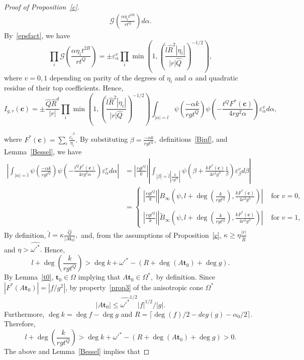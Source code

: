 \documentclass[10pt]{amsart}
\theoremstyle{plain}
\theoremstyle{plain}
\renewcommand{\vec}[1]{\mathbf{#1}}
\theoremstyle{remark}
\theoremstyle{definition}
\renewcommand{\hat}{\widehat}
\newcommand{\hQ}{\widehat{Q}}
\newcommand{\hR}{\widehat{R}}
\newcommand{\hl}{\widehat l}
\newcommand{\cG}{\mathcal{G}}
\begin{document}
\begin{proof}[Proof of Proposition~\ref{c}]
\begin{equation*}
\begin{split}
\cG\left(\frac{\alpha \eta_i t^{2R}}{rt^Q}\right)
d\alpha.
\end{split}
\end{equation*}
By~\eqref{epsfact},  we have 
\[
 \prod_{i}\cG\left(\frac{\alpha \eta_i t^{2R}}{rt^Q}\right) 
  =\pm\varepsilon_{\alpha}^{v} \prod_{i}\min\left(1,\left(\frac{\hl \hR^2|\eta_i|}{|r|\hQ}\right)^{-1/2}\right), 
\]
where $v=0 ,1$ depending on parity of the degrees of $\eta_i$ and $\alpha$ and quadratic residue of their top coefficients.   Hence,
\[
I_{g,r}(\vec{c})=\pm\frac{\hQ\hR^{d}}{|r|} \prod_{i}\min\left(1,\left(\frac{\hl \hR^2|\eta_i|}{|r|\hQ}\right)^{-1/2}\right) \int _{ |\alpha| =\hat{l}  }  \psi(\frac{-\alpha k}{rgt^Q})   \psi (-\frac{t^QF^*(\vec{c})}{4rg^2 \alpha}) \varepsilon_{\alpha}^v d\alpha,
\]

where $F^*(\vec{c})=\sum_{i} \frac{{c_i^{\prime}}^2}{\eta_i}.$  By substituting $\beta=\frac{-\alpha k}{rgt^Q},$ definitions~\eqref{Binf}, and
  Lemma~\ref{Bessel}, we have 
\begin{equation*}
\begin{split}
\left| \int _{ |\alpha| =\hat{l}  }  \psi(\frac{-\alpha k}{rgt^Q})   \psi (-\frac{t^QF^*(\vec{c})}{4rg^2 \alpha}) \varepsilon_{\alpha}^v  d\alpha \right|&
= |\frac{rgt^Q}{ k}|\left| \int _{ |\beta| =\hat{l}|\frac{k}{rgt^Q}|  }  \psi(\beta+\frac{kF^*(\vec{c})}{4r^2g^3}\frac{1}{\beta}) \varepsilon_{\beta}^v  d \beta \right|
\\&=\begin{cases} |\frac{rgt^Q}{ k}| \left|B_{\infty}(\psi,l+\deg(\frac{ k}{rgt^Q}),\frac{kF^*(\vec{c})}{4r^2g^3}) \right| &\text{ for } v=0,
\\
\\
 |\frac{rgt^Q}{ k}| \left|\tilde{B}_{\infty}(\psi,l+\deg(\frac{ k}{rgt^Q}),\frac{kF^*(\vec{c})}{4r^2g^3}) \right|&\text{ for } v=1,
\end{cases}
\end{split}
\end{equation*}
By definition, $\hl=  \kappa \frac{\hQ}{|A\vec{t}_0|},$ and, 
from the assumptions of Proposition~\ref{c},  $\kappa\geq  \eta \frac{|r|}{\hR}$ and $\eta>\hat{\omega'^*}.$ Hence,
\[
l+\deg(\frac{ k}{rgt^Q})> \deg{k}+\omega'^*-\left(R+\deg(A\vec{t}_0)+\deg g    \right).
\]
By Lemma~\ref{t0}, $\vec{t}_0\in \Omega$ implying that $A\vec{t}_0 \in \Omega^*,$ by definition. Since $|F^*(A\vec{t}_0)|=|f/g^2|$, by property~\eqref{prop3} of the anisotropic cone $\Omega^*$
\[
|A\vec{t}_0|\leq \hat{\omega'^*}^{1/2} |f|^{1/2}/|g|.
\]
Furthermore, $\deg k= \deg f -\deg g $ and $R= \lceil{\deg(f)/2} -deg(g)-\alpha_0/2\rceil.$ Therefore,
\[
l+\deg(\frac{ k}{rgt^Q})>\deg{k}+\omega'^*-\left(R+\deg(A\vec{t}_0)+\deg g    \right)> 0.
\]
The above and Lemma~\ref{Bessel} implies that 


\end{proof}
\end{document}
